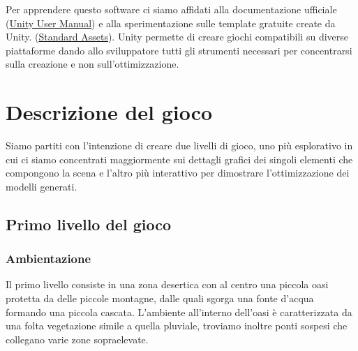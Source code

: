 \documentclass[12pt]{report}
\begin{document}
Per apprendere questo software ci siamo affidati alla documentazione ufficiale (\href{https://docs.unity3d.com/Manual/index.html}{Unity User Manual}) e alla sperimentazione sulle template gratuite create da Unity. (\href{https://assetstore.unity.com/packages/essentials/asset-packs/standard-assets-32351}{Standard Assets}).
Unity permette di creare giochi compatibili su diverse piattaforme dando allo sviluppatore tutti gli strumenti necessari per concentrarsi sulla creazione e non sull'ottimizzazione.

\section{Descrizione del gioco}
 Siamo partiti con l'intenzione di creare due livelli di gioco, uno più esplorativo in cui ci siamo concentrati maggiormente sui dettagli grafici dei singoli elementi che compongono la scena e l'altro più interattivo per dimostrare l'ottimizzazione dei modelli generati.
 
\subsection{Primo livello del gioco}
\subsubsection*{Ambientazione}
Il primo livello consiste in una zona desertica con al centro una piccola oasi protetta da delle piccole montagne, dalle quali sgorga una fonte d'acqua formando una piccola cascata. L'ambiente all'interno dell'oasi è caratterizzata da una folta vegetazione simile a quella pluviale, troviamo inoltre ponti sospesi che collegano varie zone sopraelevate.
\end{document}
